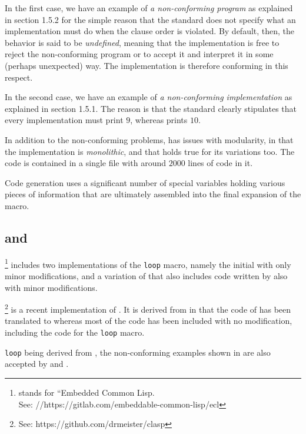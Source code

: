 In the first case, we have an example of \emph{a non-conforming
  program} as explained in section 1.5.2 for the simple reason that
the standard does not specify what an implementation must do when the
clause order is violated.  By default, then, the behavior is said to
be \emph{undefined}, meaning that the implementation is free to reject
the non-conforming program or to accept it and interpret it in some
(perhaps unexpected) way.  The \mitloop{} implementation is therefore
conforming in this respect.

In the second case, we have an example of \emph{a non-conforming
  implementation} as explained in section 1.5.1.  The reason is that
the standard clearly stipulates that every implementation must print
$9$, whereas \mitloop{} prints $10$.

In addition to the non-conforming problems, \mitloop{} has issues with
modularity, in that the implementation is \emph{monolithic}, and that
holds true for its variations too.  The code is contained in a single
file with around $2000$ lines of code in it.

Code generation uses a significant number of special variables holding
various pieces of information that are ultimately assembled into the
final expansion of the macro.

\subsection{\ecl{} and \clasp{}}

\ecl{}%
\footnote{\ecl{} stands for ``Embedded Common Lisp.\\
See: //https://gitlab.com/embeddable-common-lisp/ecl}
includes two implementations of the \texttt{loop} macro, namely
the initial \mitloop{} with only minor modifications, and a variation
of \mitloop{} that also includes code written
by \symbolics{} also with minor modifications.

\clasp{}%
\footnote{See: https://github.com/drmeister/clasp} is a recent
implementation of \commonlisp{}.  It is derived from \ecl{} in that
the \clanguage{} \cite{iso:c} code of \ecl{} has been translated to
\cplusplus{} \cite{iso:cplusplus} whereas most of the \commonlisp{}
code has been included with no modification, including the code for
the \texttt{loop} macro.

\ecl{} \texttt{loop} being derived from \mitloop{}, the non-conforming
examples shown in  are also accepted by \ecl{} and
\clasp{}.

